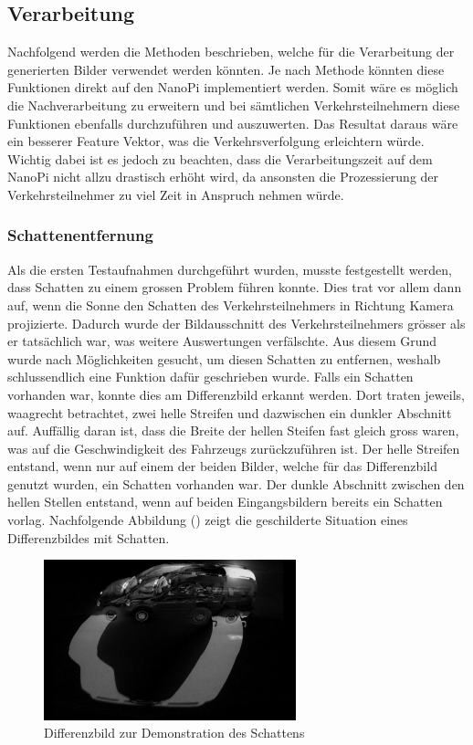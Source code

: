 \subsection{Verarbeitung}
Nachfolgend werden die Methoden beschrieben, welche für die Verarbeitung der generierten Bilder verwendet werden könnten. Je nach Methode könnten diese Funktionen direkt auf den NanoPi implementiert werden. Somit wäre es möglich die Nachverarbeitung zu erweitern und bei sämtlichen Verkehrsteilnehmern diese Funktionen ebenfalls durchzuführen und auszuwerten. Das Resultat daraus wäre ein besserer Feature Vektor, was die Verkehrsverfolgung erleichtern würde. Wichtig dabei ist es jedoch zu beachten, dass die Verarbeitungszeit auf dem NanoPi nicht allzu drastisch erhöht wird, da ansonsten die Prozessierung der Verkehrsteilnehmer zu viel Zeit in Anspruch nehmen würde.

\subsubsection{Schattenentfernung}
Als die ersten Testaufnahmen durchgeführt wurden, musste festgestellt werden, dass Schatten zu einem grossen Problem führen konnte. Dies trat vor allem dann auf, wenn die Sonne den Schatten des Verkehrsteilnehmers in Richtung Kamera projizierte. Dadurch wurde der Bildausschnitt des Verkehrsteilnehmers grösser als er tatsächlich war, was weitere Auswertungen verfälschte. Aus diesem Grund wurde nach Möglichkeiten gesucht, um diesen Schatten zu entfernen, weshalb schlussendlich eine Funktion dafür geschrieben wurde.
Falls ein Schatten vorhanden war, konnte dies am Differenzbild erkannt werden. Dort traten jeweils, waagrecht betrachtet, zwei helle Streifen und dazwischen ein dunkler Abschnitt auf. Auffällig daran ist, dass die Breite der hellen Steifen fast gleich gross waren, was auf die Geschwindigkeit des Fahrzeugs zurückzuführen ist. Der helle Streifen entstand, wenn nur auf einem der beiden Bilder, welche für das Differenzbild genutzt wurden, ein Schatten vorhanden war. Der dunkle Abschnitt zwischen den hellen Stellen entstand, wenn auf beiden Eingangsbildern bereits ein Schatten vorlag. Nachfolgende Abbildung () zeigt die geschilderte Situation eines Differenzbildes mit Schatten.

\begin{figure}[H]
  \centering
  \includegraphics[width=0.65\textwidth]{Testversuche/BlurRemoveShadow.jpg} 
  \caption{Differenzbild zur Demonstration des Schattens}
  \label{bBlurRemoveShadow}
\end{figure} 

